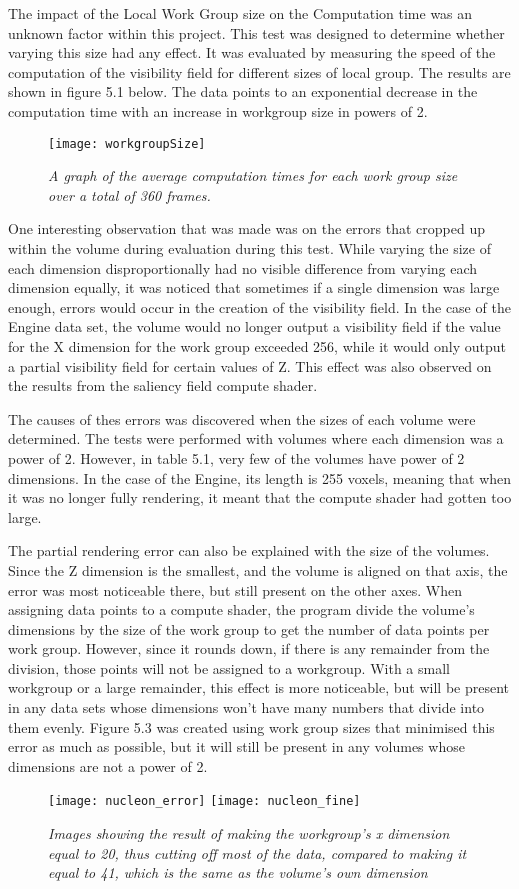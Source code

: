 The impact of the Local Work Group size on the Computation time was an unknown factor within this project. This test was designed to determine whether varying this size had any effect. It was evaluated by measuring the speed of the computation of the visibility field for different sizes of local group. The results are shown in figure 5.1 below. The data points to an exponential decrease in the computation time with an increase in workgroup size in powers of 2.

\begin{figure}[H]
\centering
\texttt{[image: workgroupSize]} 
\caption{\textit{A graph of the average computation times for each work group size over a total of 360 frames.}}
\end{figure}

One interesting observation that was made was on the errors that cropped up within the volume during evaluation during this test. While varying the size of each dimension disproportionally had no visible difference from varying each dimension equally, it was noticed that sometimes if a single dimension was large enough, errors would occur in the creation of the visibility field. In the case of the Engine data set, the volume would no longer output a visibility field if the value for the X dimension for the work group exceeded 256, while it would only output a partial visibility field for certain values of Z. This effect was also observed on the results from the saliency field compute shader.

The causes of thes errors was discovered when the sizes of each volume were determined. The tests were performed with volumes where each dimension was a power of 2. However, in table 5.1, very few of the volumes have power of 2 dimensions. In the case of the Engine, its length is 255 voxels, meaning that when it was no longer fully rendering, it meant that the compute shader had gotten too large. 

The partial rendering error can also be explained with the size of the volumes. Since the Z dimension is the smallest, and the volume is aligned on that axis, the error was most noticeable there, but still present on the other axes. When assigning data points to a compute shader, the program divide the volume's dimensions by the size of the work group to get the number of data points per work group. However, since it rounds down, if there is any remainder from the division, those points will not be assigned to a workgroup. With a small workgroup or a large remainder, this effect is more noticeable, but will be present in any data sets whose dimensions won't have many numbers that divide into them evenly. Figure 5.3 was created using work group sizes that minimised this error as much as possible, but it will still be present in any volumes whose dimensions are not a power of 2.

\begin{figure}[H]
\centering
\texttt{[image: nucleon\_error]} 
\texttt{[image: nucleon\_fine]} 
\caption{\textit{Images showing the result of making the workgroup's x dimension equal to 20, thus cutting off most of the data, compared to making it equal to 41, which is the same as the volume's own dimension}}
\end{figure}
